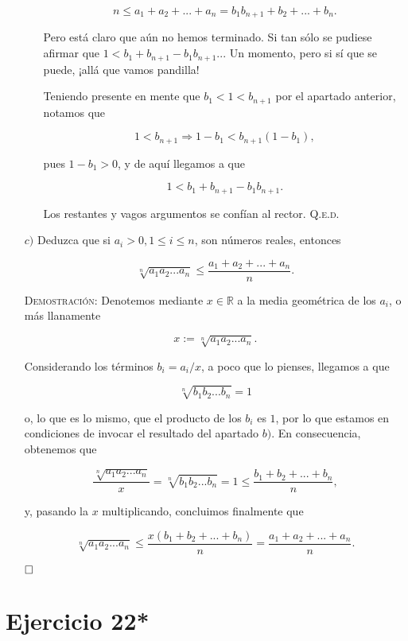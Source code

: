 \documentclass{article}
\begin{document}
\begin{itemize}
\begin{itemize}
        \[n \leq a_1 + a_2 + ... + a_n = b_1b_{n+1} + b_2 + ... + b_n.\]

        Pero está claro que aún no hemos terminado. Si tan sólo se pudiese afirmar que $1 < b_1 + b_{n + 1} - b_1b_{n + 1}$... Un momento, pero si sí que se puede, ¡allá que vamos pandilla!

        Teniendo presente en mente que $b_1 < 1 < b_{n + 1}$ por el apartado anterior, notamos que 

        \[1 < b_{n + 1} \Longrightarrow 1 - b_1 < b_{n + 1}(1 - b_1),\]

        pues $1 - b_1 > 0$, y de aquí llegamos a que

        \[1 < b_1 + b_{n + 1} - b_1b_{n + 1}.\]

        Los restantes y vagos argumentos se confían al rector. \hfill{\textsc{Q.e.d.}}
    \end{itemize}

    \item[$c)$] Deduzca que si $a_i > 0, 1 \leq i \leq n$, son números reales, entonces
    
    \[\sqrt[n]{a_1a_2...a_n} \leq \frac{a_1 + a_2 + ... + a_n}{n}.\]

    \vspace{7px}

    \textsc{Demostración}: Denotemos mediante $x \in \mathbb{R}$ a la media geométrica de los $a_i$, o más llanamente

    \[x := \sqrt[n]{a_1a_2...a_n}.\]

    Considerando los términos $b_i = a_i / x$, a poco que lo pienses, llegamos a que

    \[\sqrt[n]{b_1b_2...b_n} = 1\]

    o, lo que es lo mismo, que el producto de los $b_i$ es $1$, por lo que estamos en condiciones de invocar el resultado del apartado $b)$. En consecuencia, obtenemos que

    \[\frac{\sqrt[n]{a_1a_2...a_n}}{x} = \sqrt[n]{b_1b_2...b_n} = 1 \leq \frac{b_1 + b_2 + ... + b_n}{n},\]

    y, pasando la $x$ multiplicando, concluimos finalmente que

    \[\sqrt[n]{a_1a_2...a_n} \leq \frac{x(b_1 + b_2 + ... + b_n)}{n} = \frac{a_1 + a_2 + ... + a_n}{n}.\]

    $\hfill\square$
\end{itemize}

\newpage

\section{Ejercicio 22*}
\end{document}
